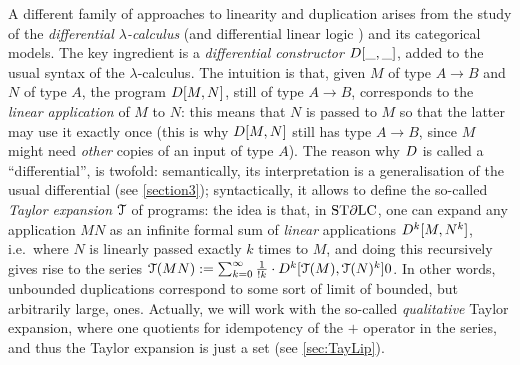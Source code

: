 A different family of approaches to linearity and duplication arises from the study of the \emph{differential $\lambda$-calculus} \cite{difflambda} (and differential linear logic \cite{dill}) and its categorical models. 
The key ingredient is a \emph{differential constructor} $\Der[\_,\_]$,  added to the usual syntax of the $\lambda$-calculus. The intuition is that, given $M$ of type $A\to B$ and $N$ of type $A$, the program $\Der[M,N]$, still of type $A\to B$, corresponds to the \emph{linear application} of $M$ to $N$: this means that $N$ is passed to $M$ so that the latter may use it exactly once (this is why $\Der[M,N]$ still has type $A\to B$, since $M$ might need \emph{other} copies of an input of type $A$). 
%
The reason why $\Der$ is called a ``differential'', is twofold: semantically, its interpretation is a generalisation of the usual differential (see \autoref{section3}); syntactically, it allows to define the so-called \emph{Taylor expansion} $\mathcal{T}$ of programs:
the idea is that, in $\mathrm{ST}\partial\mathrm{LC}$, one can expand any application $MN$ as an infinite formal sum of \emph{linear} applications
$\Der^{k}[M,N^k]$, i.e.~where $N$ is linearly passed exactly $k$ times to $M$, and doing this recursively gives rise to the series $\Te{MN} :=  \sum_{k=0}^{\infty}\frac{1}{!k}\cdot \Der^{k}[\Te{M},\Te{N}^k]0$.
In other words, unbounded duplications correspond to some sort of limit of bounded, but arbitrarily large, ones.
Actually, we will work with the so-called \emph{qualitative} Taylor expansion, where one quotients for idempotency of the $+$ operator in the series, and thus the Taylor expansion is just a set (see \autoref{sec:TayLip}).%


